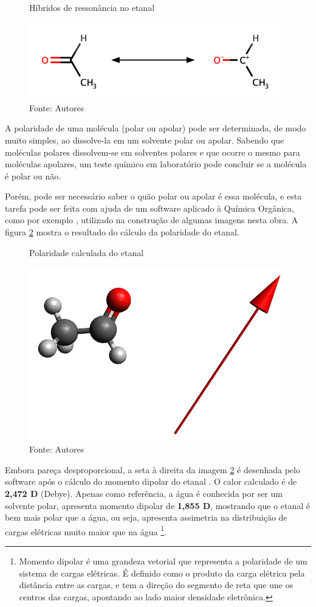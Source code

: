 \begin{figure}[h]
	\centering
	\caption{Híbridos de ressonância no etanal}
	\vspace{0.5cm}
	\includegraphics[width=0.85\linewidth]{imagens/hibridos.png}
	\caption*{Fonte: Autores}
	\label{fig:hibridos}
\end{figure}

A polaridade de uma molécula (polar ou apolar) pode ser determinada, de modo muito simples, ao dissolve-la em um solvente polar ou apolar. Sabendo que moléculas polares dissolvem-se em solventes polares e que ocorre o mesmo para moléculas apolares, um teste químico em laboratório pode concluir se a molécula é polar ou não.

Porém, pode ser necessário saber o quão polar ou apolar é essa molécula, e esta tarefa pode ser feita com ajuda de um software aplicado à Química Orgânica, como por exemplo \cite{avogadro}, utilizado na construção de algumas imagens nesta obra. A figura \ref{fig:polaridade} mostra o resultado do cálculo da polaridade do etanal. 

\begin{figure}[h]
	\centering
	\caption{Polaridade calculada do etanal}
	\vspace{0.5cm}
	\includegraphics[width=0.75\linewidth]{imagens/polaridadeetanal}
	\caption*{Fonte: Autores}
	\label{fig:polaridade}
\end{figure}

Embora pareça desproporcional, a seta à direita da imagem \ref{fig:polaridade} é desenhada pelo software após o cálculo do momento dipolar do etanal \cite{raymond2015chemistry}. O calor calculado é de \textbf{2,472 D} (Debye). Apenas como referência, a água é conhecida por ser um solvente polar, apresenta momento dipolar de \textbf{1,855 D}, mostrando que o etanal é bem mais polar que a água, ou seja, apresenta assimetria na distribuição de cargas elétricas muito maior que na água \footnote{Momento dipolar é uma grandeza vetorial que representa a polaridade de um sistema de cargas elétricas. É definido como o produto da carga elétrica pela distância entre as cargas, e tem a direção do segmento de reta que une os centros das cargas, apontando ao lado maior densidade eletrônica.}.

